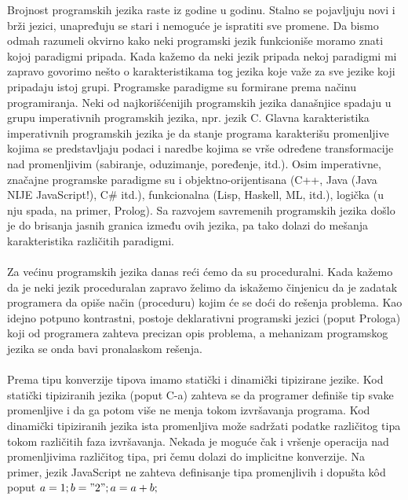 \documentclass[a4paper]{article}
\begin{document}
Brojnost programskih jezika raste iz godine u godinu. Stalno se pojavljuju novi i brži jezici, unapređuju se stari i nemoguće je ispratiti sve promene. Da bismo odmah razumeli okvirno kako neki programski jezik funkcioniše moramo znati kojoj paradigmi pripada. Kada kažemo da neki jezik pripada nekoj paradigmi mi zapravo govorimo nešto o karakteristikama tog jezika koje važe za sve jezike koji pripadaju istoj grupi. Programske paradigme su formirane prema načinu programiranja. Neki od najkorišćenijih programskih jezika današnjice spadaju u grupu imperativnih programskih jezika, npr. jezik C. Glavna karakteristika imperativnih programskih jezika je da stanje programa karakterišu promenljive kojima se predstavljaju podaci i naredbe kojima se vrše određene transformacije nad promenljivim (sabiranje, oduzimanje, poređenje, itd.). Osim imperativne, značajne programske paradigme su i
objektno-orijentisana (C++, Java (Java NIJE JavaScript!), C\# itd.), funkcionalna (Lisp, Haskell, ML, itd.), logička (u nju spada, na primer, Prolog). Sa razvojem savremenih programskih jezika došlo je do brisanja jasnih granica između ovih jezika, pa tako dolazi do mešanja karakteristika različitih paradigmi.\\\\
Za većinu programskih jezika danas reći ćemo da su proceduralni. Kada kažemo da je neki jezik proceduralan zapravo želimo da iskažemo činjenicu da je zadatak programera da opiše način (proceduru) kojim će se doći do rešenja problema. Kao idejno potpuno kontrastni, postoje deklarativni programski jezici (poput Prologa) koji od programera zahteva precizan opis problema, a mehanizam programskog jezika se onda bavi pronalaskom rešenja.\\\\
Prema tipu konverzije tipova imamo statički i dinamički tipizirane jezike. Kod statički tipiziranih jezika (poput C-a) zahteva se da programer definiše tip svake promenljive i da ga potom više ne menja tokom izvršavanja programa. Kod dinamički tipiziranih jezika ista promenljiva može sadržati podatke različitog tipa tokom različitih faza izvršavanja. Nekada je moguće čak i vršenje operacija nad promenljivima različitog tipa, pri čemu dolazi do implicitne konverzije. Na primer, jezik JavaScript ne zahteva definisanje tipa promenjlivih i dopušta kôd poput $a = 1; b = "2"; a = a + b;$\\\\
\end{document}
